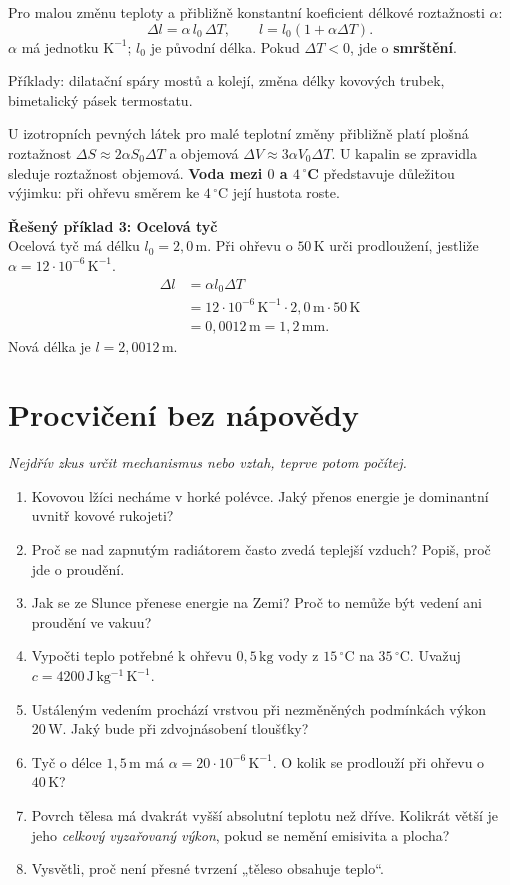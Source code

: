 \documentclass[11pt,a4paper]{article}
\newcommand{\unit}[1]{\,\mathrm{#1}}
\begin{document}
\begin{theorybox}
Pro malou změnu teploty a přibližně konstantní koeficient délkové roztažnosti $\alpha$:
\[
\boxed{\Delta l=\alpha\, l_0\,\Delta T},\qquad
\boxed{l=l_0(1+\alpha\Delta T)}.
\]
$\alpha$ má jednotku $\mathrm{K^{-1}}$; $l_0$ je původní délka. Pokud $\Delta T<0$, jde o \textbf{smrštění}.
\end{theorybox}
Příklady: dilatační spáry mostů a kolejí, změna délky kovových trubek, bimetalický pásek termostatu.

U izotropních pevných látek pro malé teplotní změny přibližně platí plošná roztažnost $\Delta S\approx 2\alpha S_0\Delta T$ a objemová $\Delta V\approx 3\alpha V_0\Delta T$.
U kapalin se zpravidla sleduje roztažnost objemová. \textbf{Voda mezi $0$ a $4\,^\circ$C} představuje důležitou výjimku: při ohřevu směrem ke $4\,^\circ$C její hustota roste.

\begin{solvedbox}
\textbf{Řešený příklad 3: Ocelová tyč}\\
Ocelová tyč má délku $l_0=2{,}0\unit m$. Při ohřevu o $50\unit K$ urči prodloužení, jestliže $\alpha=12\cdot10^{-6}\unit{K^{-1}}$.
\begin{align*}
\Delta l&=\alpha l_0\Delta T\\
 &=12\cdot10^{-6}\unit{K^{-1}}\cdot2{,}0\unit m\cdot50\unit K\\
 &=0{,}0012\unit m=\boxed{1{,}2\unit{mm}}.
\end{align*}
Nová délka je $l=\boxed{2{,}0012\unit m}$.
\end{solvedbox}

\section{Procvičení bez nápovědy}
\textit{Nejdřív zkus určit mechanismus nebo vztah, teprve potom počítej.}
\begin{enumerate}
\item Kovovou lžíci necháme v horké polévce. Jaký přenos energie je dominantní uvnitř kovové rukojeti?
\item Proč se nad zapnutým radiátorem často zvedá teplejší vzduch? Popiš, proč jde o proudění.
\item Jak se ze Slunce přenese energie na Zemi? Proč to nemůže být vedení ani proudění ve vakuu?
\item Vypočti teplo potřebné k ohřevu $0{,}5\unit{kg}$ vody z $15\,^\circ$C na $35\,^\circ$C. Uvažuj $c=4200\unit{J\,kg^{-1}\,K^{-1}}$.
\item Ustáleným vedením prochází vrstvou při nezměněných podmínkách výkon $20\unit W$. Jaký bude při zdvojnásobení tloušťky?
\item Tyč o délce $1{,}5\unit m$ má $\alpha=20\cdot10^{-6}\unit{K^{-1}}$. O kolik se prodlouží při ohřevu o $40\unit K$?
\item Povrch tělesa má dvakrát vyšší absolutní teplotu než dříve. Kolikrát větší je jeho \emph{celkový vyzařovaný výkon}, pokud se nemění emisivita a plocha?
\item Vysvětli, proč není přesné tvrzení „těleso obsahuje teplo“.
\end{enumerate}
\end{document}
